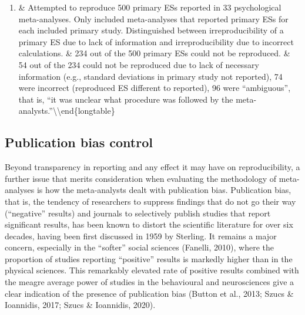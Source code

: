 \documentclass[
  man,floatsintext]{apa6}
\providecommand{\tightlist}{%
  \setlength{\itemsep}{0pt}\setlength{\parskip}{0pt}}
\begin{document}
\begin{enumerate}
\def\labelenumi{(\arabic{enumi})}
\setcounter{enumi}{2019}
\tightlist
\item
  \& Attempted to reproduce 500 primary ESs reported in 33 psychological meta-analyses. Only included meta-analyses that reported primary ESs for each included primary study. Distinguished between irreproducibility of a primary ES due to lack of information and irreproducibility due to incorrect calculations. \& 234 out of the 500 primary ESs could not be reproduced. \& 54 out of the 234 could not be reproduced due to lack of necessary information (e.g., standard deviations in primary study not reported), 74 were incorrect (reproduced ES different to reported), 96 were ``ambiguous'', that is, ``it was unclear what procedure was followed by the meta-analysts.''\textbackslash*
  \textbackslash end\{longtable\}
  \endgroup{}
  \doublespacing
\end{enumerate}

\hypertarget{publication-bias-control}{%
\subsection{Publication bias control}\label{publication-bias-control}}

Beyond transparency in reporting and any effect it may have on reproducibility, a further issue that merits consideration when evaluating the methodology of meta-analyses is how the meta-analysts dealt with publication bias. Publication bias, that is, the tendency of researchers to suppress findings that do not go their way (``negative'' results) and journals to selectively publish studies that report significant results, has been known to distort the scientific literature for over six decades, having been first discussed in 1959 by Sterling. It remains a major concern, especially in the ``softer'' social sciences (Fanelli, 2010), where the proportion of studies reporting ``positive'' results is markedly higher than in the physical sciences. This remarkably elevated rate of positive results combined with the meagre average power of studies in the behavioural and neurosciences give a clear indication of the presence of publication bias (Button et al., 2013; Szucs \& Ioannidis, 2017; Szucs \& Ioannidis, 2020).
\end{document}
